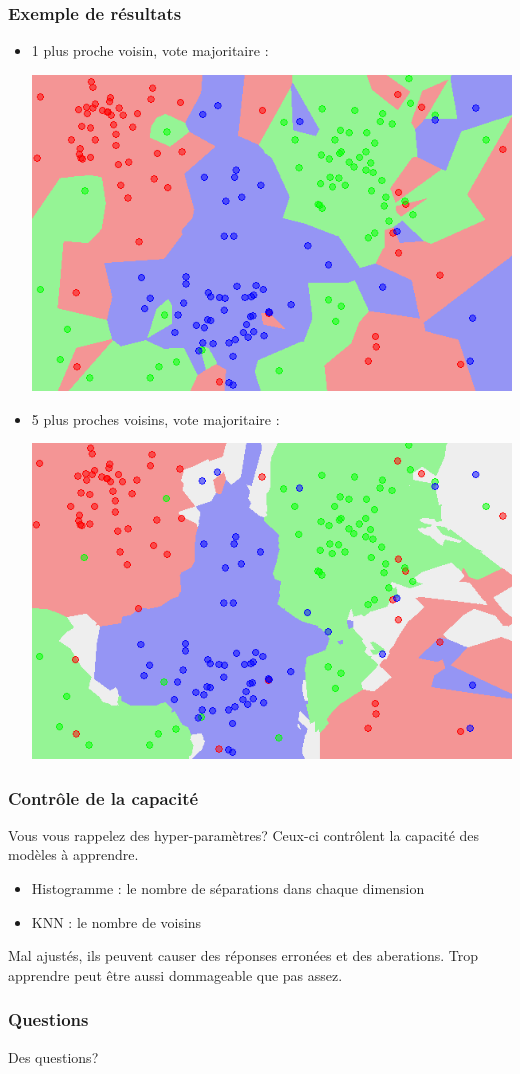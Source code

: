 \documentclass[french]{beamer}
\begin{document}
\begin{frame}
\frametitle{Exemple de résultats}
\begin{itemize}
\item 1 plus proche voisin, vote majoritaire :
\begin{center}
\includegraphics[scale=0.3]{Map1NN.png}
\end{center}

\item 5 plus proches voisins, vote majoritaire :
\begin{center}
\includegraphics[scale=0.3]{Map5NN.png}
\end{center}
\end{itemize}

\end{frame}



\begin{frame}
\frametitle{Contrôle de la capacité}
Vous vous rappelez des hyper-paramètres? Ceux-ci contrôlent la capacité des modèles à apprendre. 

\begin{itemize}
\item Histogramme : le nombre de séparations dans chaque dimension
\item KNN : le nombre de voisins
\end{itemize}

Mal ajustés, ils peuvent causer des réponses erronées et des aberations. Trop apprendre peut être aussi dommageable que pas assez.
\end{frame}

\begin{frame}
\frametitle{Questions}

\begin{center}
Des questions?
\end{center}

\end{frame}
\end{document}
